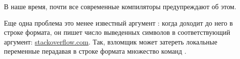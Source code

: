 В наше время, почти все современные компиляторы предупреждают об этом.

Еще одна проблема это менее известный аргумент \printf {}: когда \printf доходит до него в строке формата,
он пишет число выведенных символов в соответствующий аргумент:
\href{http://stackoverflow.com/questions/3401156/what-is-the-use-of-the-n-format-specifier-in-c}{stackoverflow.com}.
Так, взломщик может затереть локальные переменные перадавая в строке формата множество команд .


